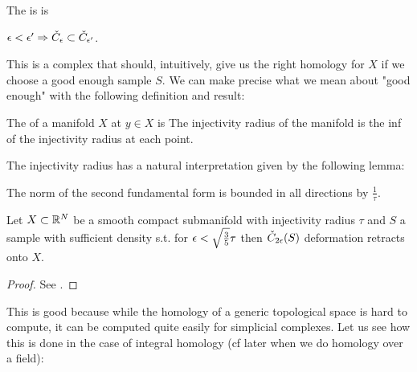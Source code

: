 \documentclass{article}
\begin{document}
\begin{definition}
	The  is is 
\end{definition}

\begin{lemma}
	$\epsilon < \epsilon^\prime \Rightarrow \check{C}_\epsilon \subset \check{C}_{\epsilon^\prime}$. 
\end{lemma}

This is a complex that should, intuitively, give us the right homology for $X$ if we choose a good enough sample $S$. We can make precise what we mean about "good enough" with the following definition and result:

\begin{definition}
	The  of a manifold $X$ at $y \in X$ is 
The injectivity radius of the manifold is the inf of the injectivity radius at each point. 
\end{definition}

The injectivity radius has a natural interpretation given by the following lemma:

\begin{lemma}
	The norm of the second fundamental form is bounded in all directions by $\frac{1}{\tau}$.
\end{lemma}

\begin{theorem}
	Let $X\subset \mathbb{R}^N$ be a smooth compact submanifold with injectivity radius $\tau$ and $S$ a sample with sufficient density s.t. 
for $\epsilon < \sqrt{\frac{3}{5}}\tau$ then $\check{C}_{2\epsilon}(S)$ deformation retracts onto $X$. 
\end{theorem}
\begin{proof}
	See \cite{Niyogi2008}.
\end{proof}

This is good because while the homology of a generic topological space is hard to compute, it can be computed quite easily for simplicial complexes. Let us see how this is done in the case of integral homology (cf later when we do homology over a field):
\vspace{3mm}
\end{document}
